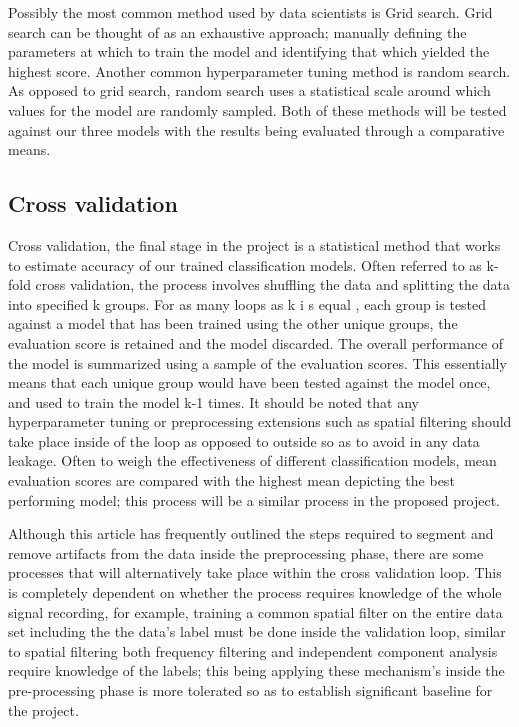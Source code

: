 \documentclass[12pt]{article}
\begin{document}
Possibly the most common method used by data scientists is Grid search. Grid search can be thought of as an exhaustive approach; manually defining the parameters at which to train the model and identifying that which yielded the highest score. Another common hyperparameter tuning method is random search. As opposed to grid search, random search uses a statistical scale around which values for the model are randomly sampled. Both of these methods will be tested against our three models with the results being evaluated through a comparative means.

\subsection{Cross validation}

Cross validation, the final stage in the project is a statistical method that works to estimate accuracy of our trained classification models. Often referred to as k-fold cross validation, the process involves shuffling the data and splitting the data into specified k groups. For as many loops as k i s equal , each group is tested against a model that has been trained using the other unique groups, the evaluation score is retained and the model discarded. The overall performance of the model is summarized using a sample of the evaluation scores. This essentially means that each unique group would have been tested against the model once, and used to train the model k-1 times. It should be noted that any hyperparameter tuning or preprocessing extensions such as spatial filtering should take place inside of the loop as opposed to outside so as to avoid in any data leakage. Often to weigh the effectiveness of different classification models, mean evaluation scores are compared with the highest mean depicting the best performing model; this process will be a similar process in the proposed project. 

Although this article has frequently outlined the steps required to segment and remove artifacts from the data inside the preprocessing phase, there are some processes that will alternatively take place within the cross validation loop. This is completely dependent on whether the process requires knowledge of the whole signal recording, for example, training a common spatial filter on the entire data set including the the data's label must be done inside the validation loop, similar to spatial filtering both frequency filtering and independent component analysis require knowledge of the labels; this being applying these mechanism's inside the pre-processing phase is more tolerated so as to establish significant baseline for the project. 



\end{document}
